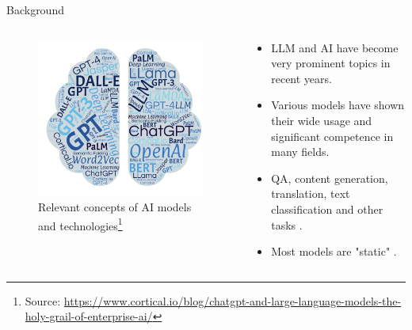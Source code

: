 \documentclass[t]{beamer}
\begin{document}
\begin{frame}{Background}
  \begin{columns}
    \begin{column}{0.4\textwidth}
        \begin{figure}
            \centering
            \includegraphics[width=\textwidth]{llm1.png}
            \caption{Relevant concepts of AI models and technologies\footnote{Source: \url{https://www.cortical.io/blog/chatgpt-and-large-language-models-the-holy-grail-of-enterprise-ai/}}}
            \label{fig:llm1}
        \end{figure}
    \end{column}
    \begin{column}{0.5\textwidth}
        \begin{itemize}
            \item LLM and AI have become very prominent topics in recent years.
            \item Various models have shown their wide usage and significant competence in many fields.
            \item QA, content generation, translation, text classification and other tasks \cite{Liu23}.
            \item Most models are "static" \cite{Gupta23}.
        \end{itemize}
    \end{column}
\end{columns}
\end{frame}
\end{document}
